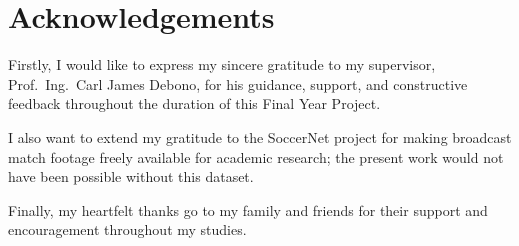 \chapter*{Acknowledgements}

Firstly, I would like to express my sincere gratitude to my supervisor, Prof.\ Ing.\ Carl James Debono, for his guidance, support, and constructive feedback throughout the duration of this Final Year Project.

I also want to extend my gratitude to the SoccerNet project for making broadcast match footage freely available for academic research; the present work would not have been possible without this dataset.

Finally, my heartfelt thanks go to my family and friends for their support and encouragement throughout my studies.